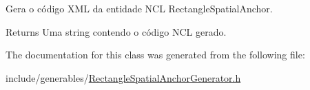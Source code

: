 Gera o código XML da entidade NCL RectangleSpatialAnchor. 

\begin{DoxyReturn}{Returns}
Uma string contendo o código NCL gerado. 
\end{DoxyReturn}


The documentation for this class was generated from the following file:\begin{DoxyCompactItemize}
\item 
include/generables/\hyperlink{RectangleSpatialAnchorGenerator_8h}{RectangleSpatialAnchorGenerator.h}\end{DoxyCompactItemize}

